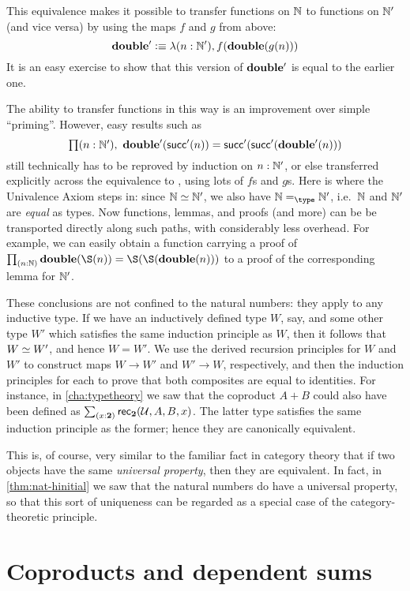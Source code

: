 This equivalence makes it possible to transfer functions on $\mathbb{N}$ to functions on $\mathbb{N}'$ (and vice versa) by using the maps $f$ and $g$ from above:
\[ \mathbf{double'} \vcentcolon\equiv \lambda(n :\mathbb{N}'), f(\mathbf{double}(g(n))) \]
It is an easy exercise to show that this version of $\mathbf{double'}$ is equal to the earlier one.

The ability to transfer functions in this way is an improvement over simple ``priming''.
However, easy results such as
\[\prd{n : \natp} \dblp(\Sp(n))=\Sp(\Sp(\dblp(n)))\]
still technically has to be reproved by induction on $n:\mathbb{N}'$, or else transferred explicitly across the equivalence to \nat, using lots of $f$s and $g$s.
Here is where the Univalence Axiom steps in: since $\mathbb{N} \simeq \mathbb{N}'$, we also have $\id[\type]{\nat}{\natp}$, i.e.\ $\mathbb{N}$ and $\mathbb{N}'$ are
\emph{equal} as types.
Now functions, lemmas, and proofs (and more) can be be transported directly along such paths, with considerably less overhead.
For example, we can easily obtain a function carrying a proof of $\prd{n : \nat} \dbl(\S(n))=\S(\S(\dbl(n)))$ to a proof of the corresponding lemma for $\mathbb{N}'$.

These conclusions are not confined to the natural numbers: they apply to any inductive type.
If we have an inductively defined type $W$, say, and some other type $W'$ which satisfies the same induction principle as $W$, then it follows that $W \simeq W'$, and hence $W=W'$.
We use the derived recursion principles for $W$ and $W'$ to construct maps $W\to W'$ and $W'\to W$, respectively, and then the induction principles for each to prove that both composites are equal to identities.
For instance, in \autoref{cha:typetheory} we saw that the coproduct $A+B$ could also have been defined as $\sm{x:\bool} \rec{\bool}(\UU,A,B,x)$.
The latter type satisfies the same induction principle as the former; hence they are canonically equivalent.

This is, of course, very similar to the familiar fact in category theory that if two objects have the same \emph{universal property}, then they are equivalent.
In fact, in \autoref{thm:nat-hinitial} we saw that the natural numbers do have a universal property, so that this sort of uniqueness can be regarded as a special case of the category-theoretic principle.



\section{Coproducts and dependent sums}
\label{sec:coprod-depsum}

